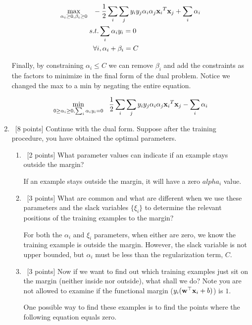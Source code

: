 \documentclass[12pt, fullpage,letterpaper]{article}
\begin{document}
\begin{enumerate}
		
		\begin{align*}
		\max\limits_{\alpha_i \ge 0, \beta_i \ge 0} &\;\;\; - \frac{1}{2} \sum_i \sum_j y_i y_j \alpha_i \alpha_j {{\bf x}_i}^T {\bf x}_j + \sum_i \alpha_i \\		
		&\; s.t. \sum_i \alpha_i y_i = 0 \\
		&\;\;\; \forall i, \alpha_i + \beta_i = C 
		\end{align*}
		
		Finally, by constraining $\alpha_i \le C$ we can remove $\beta_i$ and add the constraints as the factors to minimize in the final form of the dual problem. Notice we changed the max to a min by negating the entire equation. 
		
		
	 	\begin{align*}
		\min\limits_{0 \ge \alpha_i \ge 0, \sum_i \alpha_i y_i = 0} &\;\;\;  \frac{1}{2} \sum_i \sum_j y_i y_j \alpha_i \alpha_j {{\bf x}_i}^T {\bf x}_j - \sum_i \alpha_i \\	
		\end{align*}
	
	
	\item~[8 points] Continue with the dual form. Suppose after the training procedure, you have obtained the optimal parameters.
	\begin{enumerate}
		\item~[2 points] What parameter values can indicate if an example stays outside the margin?

		If an example stays outside the margin, it will have a zero $alpha_i$ value.		
		
		\item~[3 points] What are common and what are different when we use these parameters and the slack variables $\{\xi_i\}$ to determine the relevant positions of the training examples to the margin?

		For both the $\alpha_i$ and $\xi_i$ parameters, when either are zero, we know the training example is outside the margin. However, the slack variable is not upper bounded, but $\alpha_i$ must be less than the regularization term, $C$.		
		
		\item~[3 points] Now if we want to find out which training examples just sit on the margin (neither inside nor outside), what shall we do? Note you are not allowed to examine if the functional margin (\ie $y_i({\bf w}^\top{\bf x}_i +b)$) is $1$.
		
		One possible way to find these examples is to find the points where the following equation equals zero.
		

\end{enumerate}
\end{enumerate}
\end{document}
